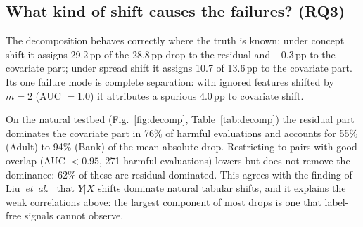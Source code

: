\documentclass[conference]{IEEEtran}
\theoremstyle{plainhead}
\newcommand{\pp}{\,pp\xspace}
\begin{document}
\subsection{What kind of shift causes the failures? (RQ3)}
The decomposition behaves correctly where the truth is known: under concept shift it assigns 29.2\pp of the 28.8\pp drop to the residual and $-0.3$\pp to the covariate part; under spread shift it assigns 10.7 of 13.6\pp to the covariate part. Its one failure mode is complete separation: with ignored features shifted by $m=2$ (AUC $=1.0$) it attributes a spurious 4.0\pp to covariate shift.

On the natural testbed (Fig.~\ref{fig:decomp}, Table~\ref{tab:decomp}) the residual part dominates the covariate part in 76\% of harmful evaluations and accounts for 55\% (Adult) to 94\% (Bank) of the mean absolute drop. Restricting to pairs with good overlap (AUC $<0.95$, 271 harmful evaluations) lowers but does not remove the dominance: 62\% of these are residual-dominated. This agrees with the finding of Liu~\textit{et~al.}~\cite{liu2023need} that $Y|X$ shifts dominate natural tabular shifts, and it explains the weak correlations above: the largest component of most drops is one that label-free signals cannot observe.
\end{document}
